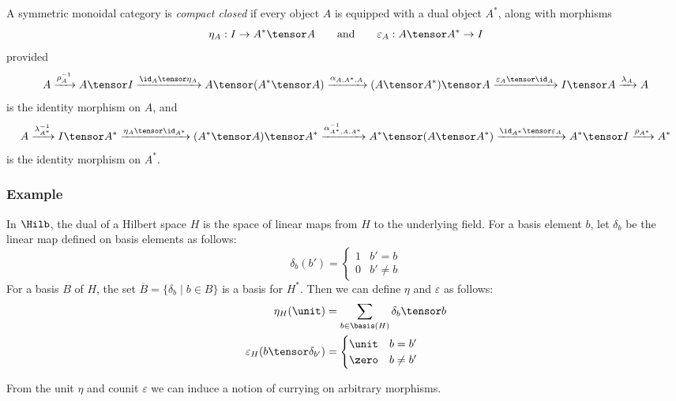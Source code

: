 \begin{definition}
A symmetric monoidal category is \emph{compact closed} if every object $A$ is
equipped with a dual object $A^*$, along with morphisms
\[ \eta_A : I \rightarrow A^* \tensor A \qquad\text{and}\qquad
   \varepsilon_A : A \tensor A^* \rightarrow I \]
provided
\[
    A \xrightarrow{\rho_A^{-1}} A \tensor I
    \xrightarrow{\id_A \tensor \eta_A} A\tensor(A^* \tensor A)
    \xrightarrow{\alpha_{A,A^*,A}} (A \tensor A^*)\tensor A
    \xrightarrow{\varepsilon_A \tensor \id_A} I \tensor A
    \xrightarrow{\lambda_A} A
\]
is the identity morphism on $A$, and
\[
    A \xrightarrow{\lambda_{A^*}^{-1}} I \tensor A^*
    \xrightarrow{\eta_A \tensor \id_{A^*}} (A^* \tensor A) \tensor A^*
    \xrightarrow{\alpha_{A^*,A,A^*}^{-1}} A^* \tensor (A \tensor A^*) 
    \xrightarrow{\id_{A^*} \tensor \varepsilon_A} A^* \tensor I
    \xrightarrow{\rho_{A^*}} A^*
\]
is the identity morphism on $A^*$.
\end{definition}

\subsubsection*{Example} In $\Hilb$, the dual
of a Hilbert space $H$ is the space of linear maps from $H$
to the underlying field. For a basis element $b$, let $\delta_b$
be the linear map defined on basis elements as follows:
\[ \delta_b(b') = \begin{cases}
    1 &b'=b \\
    0 &b' \neq b
\end{cases}\]
For a basis $B$ of $H$, the set $\overline{B} = \{\delta_b \mid b \in B\}$
is a basis for $H^*$. Then we can define $\eta$ and $\varepsilon$ as follows:
\begin{align*}
    \eta_H(\unit) &= \sum_{b \in \basis(H)} \delta_b \tensor b \\
    \varepsilon_H(b \tensor \delta_{b'}) &= 
        \begin{cases}   
            \unit &b = b' \\
            \zero &b \neq b'
        \end{cases}
\end{align*}

From the unit $\eta$ and counit $\varepsilon$ we can induce a notion of currying
on arbitrary morphisms.

